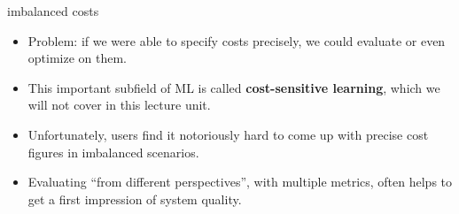 \documentclass[11pt,compress,t,notes=noshow, xcolor=table]{beamer}
\begin{document}
\begin{vbframe}{imbalanced costs}
\lz

\begin{itemize}
  \item Problem: if we were able to specify costs precisely, we could evaluate
  or even optimize on them.
  \item This important subfield of ML is called \textbf{cost-sensitive
  learning}, which we will not cover in this lecture unit.
  \item Unfortunately, users find it notoriously hard to come up with
  precise cost figures in imbalanced scenarios.
  \item Evaluating \enquote{from different perspectives}, with multiple metrics,
  often helps to get a first impression of system quality.
\end{itemize}

\end{vbframe}



\end{document}
